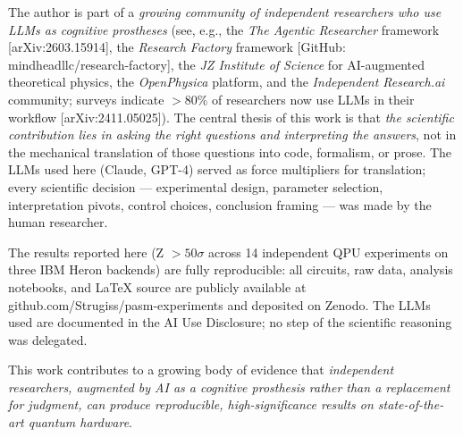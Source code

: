﻿\documentclass[12pt,a4paper]{article}
\begin{document}
The author is part of a \textit{growing community of independent researchers who use LLMs as cognitive prostheses} (see, e.g., the \textit{The Agentic Researcher} framework [arXiv:2603.15914], the \textit{Research Factory} framework [GitHub: mindheadllc/research-factory], the \textit{JZ Institute of Science} for AI-augmented theoretical physics, the \textit{OpenPhysica} platform, and the \textit{Independent Research.ai} community; surveys indicate $>80\%$ of researchers now use LLMs in their workflow [arXiv:2411.05025]). The central thesis of this work is that \textit{the scientific contribution lies in asking the right questions and interpreting the answers}, not in the mechanical translation of those questions into code, formalism, or prose. The LLMs used here (Claude, GPT-4) served as force multipliers for translation; every scientific decision — experimental design, parameter selection, interpretation pivots, control choices, conclusion framing — was made by the human researcher.

The results reported here (Z $> 50\sigma$ across 14 independent QPU experiments on three IBM Heron backends) are fully reproducible: all circuits, raw data, analysis notebooks, and LaTeX source are publicly available at github.com/Strugiss/pasm-experiments and deposited on Zenodo. The LLMs used are documented in the AI Use Disclosure; no step of the scientific reasoning was delegated.

This work contributes to a growing body of evidence that \textit{independent researchers, augmented by AI as a cognitive prosthesis rather than a replacement for judgment, can produce reproducible, high-significance results on state-of-the-art quantum hardware}.
\end{document}
